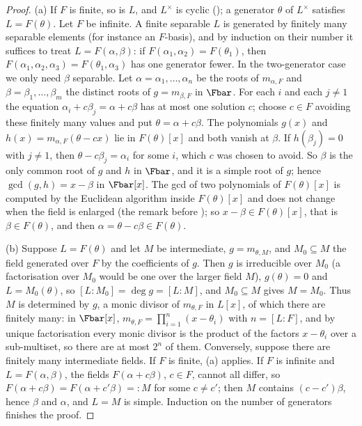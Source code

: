 \begin{proof}
(a) If $F$ is finite, so is $L$, and $L^\times$ is cyclic (); a generator $\theta$ of $L^\times$ satisfies $L=F(\theta)$. Let $F$ be infinite. A finite separable $L$ is
generated by finitely many separable elements (for instance an $F$-basis), and by induction on their number it suffices to treat $L=F(\alpha,\beta)$: if
$F(\alpha_1,\alpha_2)=F(\theta_1)$, then $F(\alpha_1,\alpha_2,\alpha_3)=F(\theta_1,\alpha_3)$ has one generator fewer. In the two-generator case we only need $\beta$
separable. Let $\alpha=\alpha_1,\dots,\alpha_n$ be
the roots of $m_{\alpha,F}$ and $\beta=\beta_1,\dots,\beta_m$ the distinct roots of $g=m_{\beta,F}$ in $\Fbar$. For each $i$ and each $j\ne1$ the equation
$\alpha_i+c\beta_j=\alpha+c\beta$ has at most one solution $c$; choose $c\in F$ avoiding these finitely many values and put $\theta=\alpha+c\beta$. The
polynomials $g(x)$ and $h(x)=m_{\alpha,F}(\theta-cx)$ lie in $F(\theta)[x]$ and both vanish at $\beta$. If $h(\beta_j)=0$ with $j\ne1$, then $\theta-c\beta_j=\alpha_i$
for some $i$, which $c$ was chosen to avoid. So $\beta$ is the only common root of $g$ and $h$ in $\Fbar$, and it is a simple root of $g$; hence
$\gcd(g,h)=x-\beta$ in $\Fbar[x]$. The gcd of two polynomials of $F(\theta)[x]$ is computed by the Euclidean algorithm inside $F(\theta)[x]$ and does not change
when the field is enlarged (the remark before ); so $x-\beta\in F(\theta)[x]$, that is $\beta\in F(\theta)$, and
then $\alpha=\theta-c\beta\in F(\theta)$.

(b) Suppose $L=F(\theta)$ and let $M$ be intermediate, $g=m_{\theta,M}$, and $M_0\subseteq M$ the field generated over $F$ by the coefficients of $g$. Then $g$ is
irreducible over $M_0$ (a factorisation over $M_0$ would be one over the larger field $M$), $g(\theta)=0$ and $L=M_0(\theta)$, so $[L:M_0]=\deg g=[L:M]$, and
$M_0\subseteq M$ gives $M=M_0$. Thus $M$ is determined by $g$, a monic divisor of $m_{\theta,F}$ in $L[x]$, of
which there are finitely many: in $\Fbar[x]$, $m_{\theta,F}=\prod_{i=1}^n(x-\theta_i)$ with $n=[L:F]$, and by unique factorisation every monic divisor is the product of
the factors $x-\theta_i$ over a sub-multiset, so there are at most $2^n$ of them. Conversely, suppose there are finitely many intermediate fields. If $F$ is finite, (a) applies. If $F$ is infinite and
$L=F(\alpha,\beta)$, the fields $F(\alpha+c\beta)$, $c\in F$, cannot all differ, so $F(\alpha+c\beta)=F(\alpha+c'\beta)=:M$ for some $c\ne c'$; then $M$ contains
$(c-c')\beta$, hence $\beta$ and $\alpha$, and $L=M$ is simple. Induction on the number of generators finishes the proof.
\end{proof}


